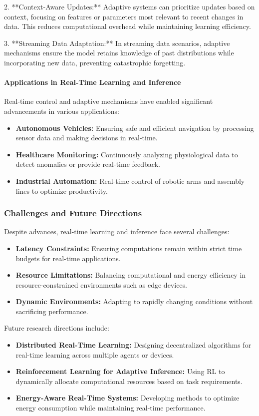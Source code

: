 \documentclass{IEEEojcsys}
\begin{document}
2. **Context-Aware Updates:**
   Adaptive systems can prioritize updates based on context, focusing on features or parameters most relevant to recent changes in data. This reduces computational overhead while maintaining learning efficiency.

3. **Streaming Data Adaptation:**
   In streaming data scenarios, adaptive mechanisms ensure the model retains knowledge of past distributions while incorporating new data, preventing catastrophic forgetting.

\paragraph{Applications in Real-Time Learning and Inference}
Real-time control and adaptive mechanisms have enabled significant advancements in various applications:
\begin{itemize}
    \item \textbf{Autonomous Vehicles:} Ensuring safe and efficient navigation by processing sensor data and making decisions in real-time.
    \item \textbf{Healthcare Monitoring:} Continuously analyzing physiological data to detect anomalies or provide real-time feedback.
    \item \textbf{Industrial Automation:} Real-time control of robotic arms and assembly lines to optimize productivity.
\end{itemize}

\subsubsection{Challenges and Future Directions}
Despite advances, real-time learning and inference face several challenges:
\begin{itemize}
    \item \textbf{Latency Constraints:} Ensuring computations remain within strict time budgets for real-time applications.
    \item \textbf{Resource Limitations:} Balancing computational and energy efficiency in resource-constrained environments such as edge devices.
    \item \textbf{Dynamic Environments:} Adapting to rapidly changing conditions without sacrificing performance.
\end{itemize}

Future research directions include:
\begin{itemize}
    \item \textbf{Distributed Real-Time Learning:} Designing decentralized algorithms for real-time learning across multiple agents or devices.
    \item \textbf{Reinforcement Learning for Adaptive Inference:} Using RL to dynamically allocate computational resources based on task requirements.
    \item \textbf{Energy-Aware Real-Time Systems:} Developing methods to optimize energy consumption while maintaining real-time performance.
\end{itemize}
\end{document}
